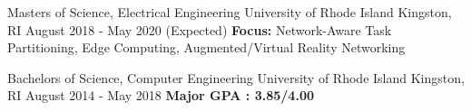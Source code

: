 \gradheader
\begin{cventries}
  \cventry
    {Masters of Science, Electrical Engineering}
    {University of Rhode Island}
    {Kingston, RI}
    {August 2018 - May 2020 (Expected)}
    {\textbf{Focus:} Network-Aware Task Partitioning, Edge Computing, Augmented/Virtual Reality Networking}
\end{cventries}
\ugradheader
\begin{cventries}
  \cventry
  {Bachelors of Science, Computer Engineering}
  {University of Rhode Island}
  {Kingston, RI}
  {August 2014 - May 2018}
  {\textbf{Major GPA : 3.85/4.00}}
\end{cventries}
